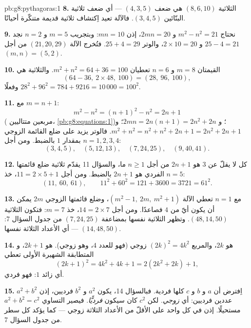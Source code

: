 \begin{solution}{pb:g8:pythagoras:1}
\textbf{8.} الثلاثية $(8, 6, 10)$ هي ضعف $(4, 3, 5)$ --- أي
ضعف ثلاثية البنّائين $(3, 4, 5)$. فالآلة تعيد اِكتشاف
ثلاثية قديمة متنكّرة أحيانًا.

\textbf{9.} نحتاج $m^2 - n^2 = 21$ و $2mn = 20$، إذن
$mn = 10$: وبتجريب $m = 5$ و $n = 2$ نجد $25 - 4 = 21$ و
$2 \times 10 = 20$، والوتر $25 + 4 = 29$. فتُخرج الآلة
$(21, 20, 29)$ من أجل $(m, n) = (5, 2)$.

\textbf{10.} القيمتان $m = 8$ و $n = 6$ تعطيان $m^2 + n^2 = 64 + 36 = 100$.
والثلاثية هي
\[
\left(64 - 36,\ 2 \times 48,\ 100\right) = (28,\ 96,\ 100),
\]
وفعلًا $28^2 + 96^2 = 784 + 9216 = 10\,000 = 100^2$.

\textbf{11.} مع $m = n + 1$:
\[
m^2 - n^2 = (n + 1)^2 - n^2 = 2n + 1
\]
( مربعين متتاليين، \cref{pb:g8:equations:1})؛
و $2mn = 2n(n + 1) = 2n^2 + 2n$؛ و
$m^2 + n^2 = n^2 + n^2 + 2n + 1 = 2n^2 + 2n + 1$. فالوتر
يزيد على ضلع القائمة الزوجي بمقدار $1$ بالضبط. ومن أجل $n = 1, 2, 3, 4$:
\[
(3, 4, 5), \quad (5, 12, 13), \quad (7, 24, 25), \quad
(9, 40, 41) .
\]

\textbf{12.} كل  لا يقلّ عن $3$ هو $2n + 1$ من أجل
$n \geq 1$ ما، والسؤال 11 يقدّم ثلاثية ضلع قائمتها الفردي
هو $2n + 1$ بالضبط. ومن أجل $11 = 2 \times 5 + 1$، خذ $n = 5$:
\[
(11,\ 60,\ 61),
\qquad
11^2 + 60^2 = 121 + 3600 = 3721 = 61^2 .
\]

\textbf{13.} مع $n = 1$ تعطي الآلة
$\left(m^2 - 1,\ 2m,\ m^2 + 1\right)$، وضلع قائمتها الزوجي $2m$ يمكن أن يكون
أيّ  من $4$ فصاعدًا. ومن أجل $14 = 2 \times 7$، خذ
$m = 7$: فتكون الثلاثية $(48, 14, 50)$. وتظهر الثلاثية نفسها
بمضاعفة $(7, 24, 25)$ من جدول السؤال 7:
$(14, 48, 50)$ --- أي الأعداد الثلاثة نفسها.

\textbf{14.}  هو $2k$، والمربع $(2k)^2 = 4k^2$ زوجي
(فهو  للعدد $4$، وهو زوجي).  هو $2k + 1$، و
المتطابقة الشهيرة الأولى تعطي
\[
(2k + 1)^2 = 4k^2 + 4k + 1 = 2\left(2k^2 + 2k\right) + 1 ,
\]
أي  زائد $1$: فهو فردي.

\textbf{15.} اِفترض أن $a$ و $b$ و $c$ كلها فردية. فبالسؤال
14، يكون $a^2$ و $b^2$ فرديين، إذن $a^2 + b^2$  عددين
فرديين: أي \emph{زوجي}. لكن $c^2$ كان سيكون \emph{فرديًّا}. فيصير التساوي
$a^2 + b^2 = c^2$ مستحيلًا. إذن في كل  واحد على الأقلّ من الأعداد الثلاثة زوجي --- كما يؤكد كل
سطر من جدول السؤال 7.
\end{solution}
